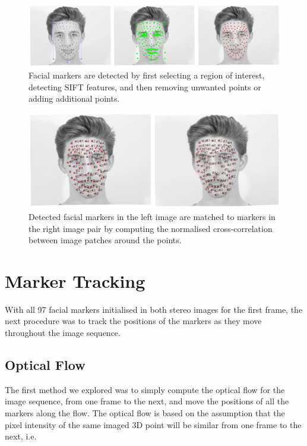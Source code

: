 \begin{figure}[htbp!]
\centering
\includegraphics[width=\textwidth]{img/detection}
	\caption{Facial markers are detected by first selecting a region of interest, detecting SIFT features, and then removing unwanted points or adding additional points.}
	\label{fig:detection}
\end{figure}

\begin{figure}[htbp!]
\centering
\includegraphics[width=\textwidth]{img/matching}
	\caption{Detected facial markers in the left image are matched to markers in the right image pair by computing the normalised cross-correlation between image patches around the points.}
	\label{fig:matching}
\end{figure}

\section{Marker Tracking}

With all 97 facial markers initialised in both stereo images for the first frame, the next procedure was to track the positions of the markers as they move throughout the image sequence. 

\subsection{Optical Flow}

The first method we explored was to simply compute the optical flow for the image sequence, from one frame to the next, and move the positions of all the markers along the flow. The optical flow is based on the assumption that the pixel intensity of the same imaged 3D point will be similar from one frame to the next, i.e.

